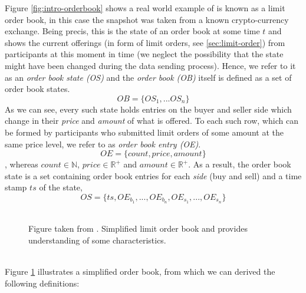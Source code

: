 Figure \ref{fig:intro-orderbook} shows a real world example of is known as a limit order book, in this case the snapshot was taken from a known crypto-currency exchange.
Being precis, this is the state of an order book at some time $t$ and shows the current offerings (in form of limit orders, see \ref{sec:limit-order}) from participants at this moment in time (we neglect the possibility that the state might have been changed during the data sending process). 
Hence, we refer to it as an \textit{order book state (OS)} and the \textit{order book (OB)} itself is defined as a set of order book states.
\begin{equation}
OB=\{OS_1, ... OS_n\}
\end{equation}
As we can see, every such state holds entries on the buyer and seller side which change in their \textit{price} and \textit{amount} of what is offered.
To each such row, which can be formed by participants who submitted limit orders of some amount at the same price level, we refer to as \textit{order book entry (OE)}.
\begin{equation}
OE=\{count, price, amount\}
\end{equation}
, whereas $count \in \mathbb{N}$, $price \in \mathbb{R^+}$ and $amount \in \mathbb{R^+}$.
As a result, the order book state is a set containing order book entries for each \textit{side} (buy and sell) and a time stamp $ts$ of the state,
\begin{equation}
OS=\{ts, OE_{b_1}, ..., OE_{b_n}, OE_{s_1}, ..., OE_{s_n}\}
\end{equation}
\\
\begin{figure}[H]
    \centering
    \caption{Figure taken from \cite{miranda}. Simplified limit order book and provides understanding of some characteristics.}
    \label{fig:orderbook-simple}
\end{figure}
\hfill
\\
Figure \ref{fig:orderbook-simple} illustrates a simplified order book, from which we can derived the following definitions:

